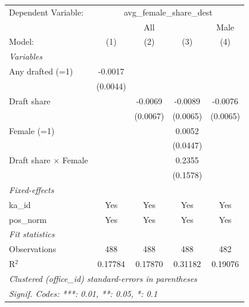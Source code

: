 \begingroup
\centering
\begin{tabular}{lcccc}
   \tabularnewline \midrule \midrule
   Dependent Variable: & \multicolumn{4}{c}{avg\_female\_share\_dest}\\
    & \multicolumn{3}{c}{All} & Male \\ 
   Model:                       & (1)      & (2)      & (3)      & (4)\\  
   \midrule
   \emph{Variables}\\
   Any drafted (=1)             & -0.0017  &          &          &   \\   
                                & (0.0044) &          &          &   \\   
   Draft share                  &          & -0.0069  & -0.0089  & -0.0076\\   
                                &          & (0.0067) & (0.0065) & (0.0065)\\   
   Female (=1)                  &          &          & 0.0052   &   \\   
                                &          &          & (0.0447) &   \\   
   Draft share $\times$ Female  &          &          & 0.2355   &   \\   
                                &          &          & (0.1578) &   \\   
   \midrule
   \emph{Fixed-effects}\\
   ka\_id                       & Yes      & Yes      & Yes      & Yes\\  
   pos\_norm                    & Yes      & Yes      & Yes      & Yes\\  
   \midrule
   \emph{Fit statistics}\\
   Observations                 & 488      & 488      & 488      & 482\\  
   R$^2$                        & 0.17784  & 0.17870  & 0.31182  & 0.19076\\  
   \midrule \midrule
   \multicolumn{5}{l}{\emph{Clustered (office\_id) standard-errors in parentheses}}\\
   \multicolumn{5}{l}{\emph{Signif. Codes: ***: 0.01, **: 0.05, *: 0.1}}\\
\end{tabular}
\par\endgroup

